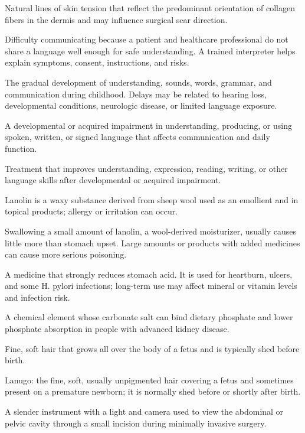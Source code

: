  Natural lines of skin tension that reflect the predominant orientation of collagen fibers in the dermis and may influence surgical scar direction.

 Difficulty communicating because a patient and healthcare professional do not share a language well enough for safe understanding. A trained interpreter helps explain symptoms, consent, instructions, and risks.

 The gradual development of understanding, sounds, words, grammar, and communication during childhood. Delays may be related to hearing loss, developmental conditions, neurologic disease, or limited language exposure.

 A developmental or acquired impairment in understanding, producing, or using spoken, written, or signed language that affects communication and daily function.

 Treatment that improves understanding, expression, reading, writing, or other language skills after
developmental or acquired impairment.

 Lanolin is a waxy substance derived from sheep wool used as an emollient and in topical products; allergy or irritation can occur.

 Swallowing a small amount of lanolin, a wool-derived moisturizer, usually causes little more than stomach upset. Large amounts or products with added medicines can cause more serious poisoning.

 A medicine that strongly reduces stomach acid. It is used for heartburn, ulcers, and some H. pylori infections; long-term use may affect mineral or vitamin levels and infection risk.

 A chemical element whose carbonate salt can bind dietary phosphate and lower phosphate absorption in people with advanced kidney disease.

 Fine, soft hair that grows all over the body of a fetus and is typically shed before
birth.

 Lanugo: the fine, soft, usually unpigmented hair covering a fetus and sometimes present on a premature newborn; it is normally shed before or shortly after birth.

 A slender instrument with a light and camera used to view the abdominal or pelvic cavity through a small incision during minimally invasive surgery.

